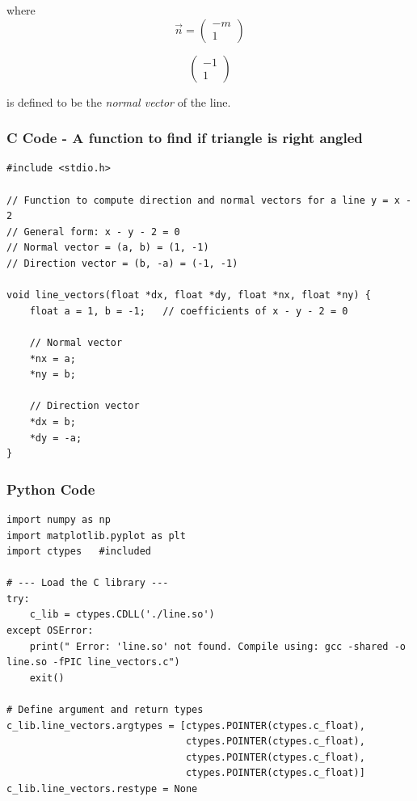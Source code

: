 \documentclass{beamer}
\begin{document}
\begin{frame}{}
where
\[
\vec{n} =
\begin{pmatrix}
-m \\ 1
\end{pmatrix}
\tag{4.2.18.9}
\]

\[
\begin{pmatrix}
-1 \\ 1
\end{pmatrix}
\]




is defined to be the \textit{normal vector} of the line.
\end{frame} 

\begin{frame}[fragile]
    \frametitle{C Code - A function to find if triangle is right angled }

    \begin{lstlisting}
#include <stdio.h>

// Function to compute direction and normal vectors for a line y = x - 2
// General form: x - y - 2 = 0
// Normal vector = (a, b) = (1, -1)
// Direction vector = (b, -a) = (-1, -1)

void line_vectors(float *dx, float *dy, float *nx, float *ny) {
    float a = 1, b = -1;   // coefficients of x - y - 2 = 0

    // Normal vector
    *nx = a;
    *ny = b;

    // Direction vector
    *dx = b;
    *dy = -a;
}
     \end{lstlisting}
\end{frame}

\begin{frame}[fragile]
    \frametitle{Python Code}
    \begin{lstlisting}
import numpy as np
import matplotlib.pyplot as plt
import ctypes   #included

# --- Load the C library ---
try:
    c_lib = ctypes.CDLL('./line.so')
except OSError:
    print(" Error: 'line.so' not found. Compile using: gcc -shared -o line.so -fPIC line_vectors.c")
    exit()

# Define argument and return types
c_lib.line_vectors.argtypes = [ctypes.POINTER(ctypes.c_float),
                               ctypes.POINTER(ctypes.c_float),
                               ctypes.POINTER(ctypes.c_float),
                               ctypes.POINTER(ctypes.c_float)]
c_lib.line_vectors.restype = None
        \end{lstlisting}
\end{frame}
\end{document}

